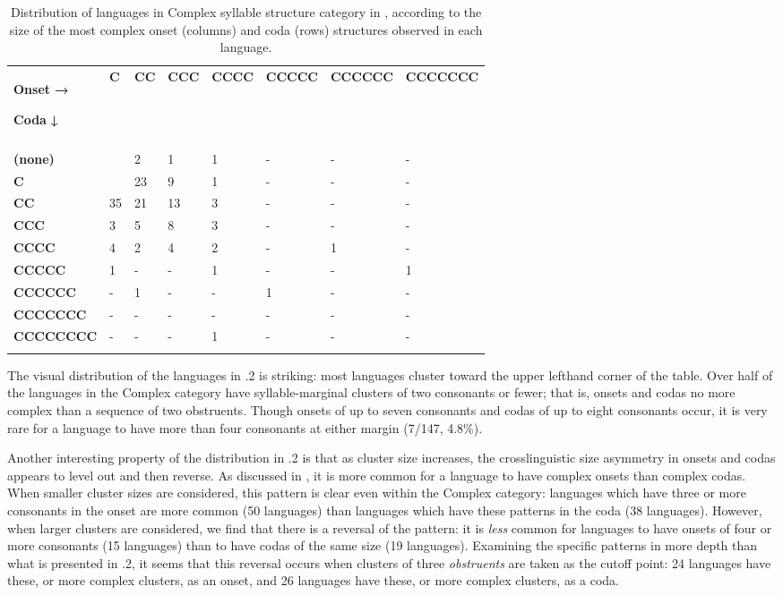 \begin{table}
\begin{tabularx}{\textwidth}{XXXXXXXX}
\lsptoprule
{ \textbf{Onset} \textbf{→}}

 \textbf{Coda} \textbf{↓} & \textbf{C} & \textbf{CC} & \textbf{CCC} & \textbf{CCCC} & \textbf{CCCCC} & \textbf{CCCCCC} & \textbf{CCCCCCC}\\
&  &  &  &  &  &  & \\
 \textbf{(none)} &  & 2 & 1 & 1 & - & - & -\\
\hhline{-~------}
 \textbf{C} &  & 23 & 9 & 1 & - & - & -\\
 \textbf{CC} & 35 & 21 & 13 & 3 & - & - & -\\
 \textbf{CCC} & 3 & 5 & 8 & 3 & - & - & -\\
 \textbf{CCCC} & 4 & 2 & 4 & 2 & - & 1 & -\\
 \textbf{CCCCC} & 1 & - & - & 1 & - & - & 1\\
 \textbf{CCCCCC} & - & 1 & - & - & 1 & - & -\\
 \textbf{CCCCCCC} & - & - & - & - & - & - & -\\
 \textbf{CCCCCCCC} & - & - & - & 1 & - & - & -\\
\lspbottomrule
\end{tabularx}
\caption{\label{tab:key:2.2.} Distribution of languages in Complex syllable structure category in \citet{Maddieson2013a}, according to the size of the most complex onset (columns) and coda (rows) structures observed in each language.}
\end{table}

  The visual distribution of the languages in .2 is striking: most languages cluster toward the upper lefthand corner of the table. Over half of the languages in the Complex category have syllable-marginal clusters of two consonants or fewer; that is, onsets and codas no more complex than a sequence of two obstruents. Though onsets of up to seven consonants and codas of up to eight consonants occur, it is very rare for a language to have more than four consonants at either margin (7/147, 4.8\%).

  Another interesting property of the distribution in .2 is that as cluster size increases, the crosslinguistic size asymmetry in onsets and codas appears to level out and then reverse. As discussed in , it is more common for a language to have complex onsets than complex codas. When smaller cluster sizes are considered, this pattern is clear even within the Complex category: languages which have three or more consonants in the onset are more common (50 languages) than languages which have these patterns in the coda (38 languages). However, when larger clusters are considered, we find that there is a reversal of the pattern: it is \textit{less} common for languages to have onsets of four or more consonants (15 languages) than to have codas of the same size (19 languages). Examining the specific patterns in more depth than what is presented in .2, it seems that this reversal occurs when clusters of three \textit{obstruents} are taken as the cutoff point: 24 languages have these, or more complex clusters, as an onset, and 26 languages have these, or more complex clusters, as a coda.

